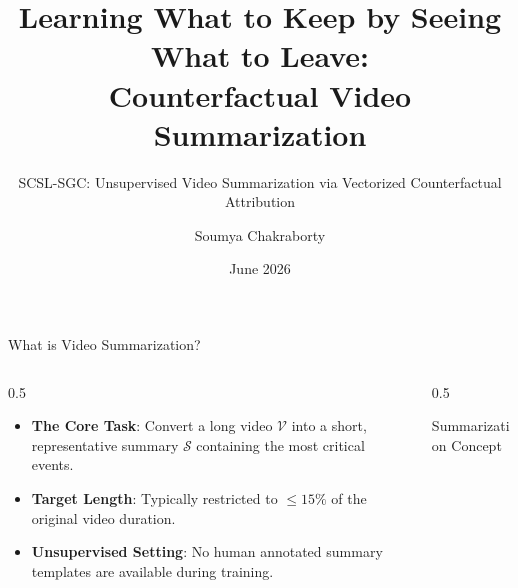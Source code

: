 \documentclass[aspectratio=169]{beamer}
\title[Learning What to Keep by Seeing What to Leave]{Learning What to Keep by Seeing What to Leave:\\Counterfactual Video Summarization}
\subtitle{SCSL-SGC: Unsupervised Video Summarization via Vectorized Counterfactual Attribution}
\author[Soumya Chakraborty]{Soumya Chakraborty}
\institute[AAAI '26]{AAAI Conference on Artificial Intelligence}
\date{June 2026}
\begin{document}
\begin{frame}
    \titlepage
\end{frame}

\begin{frame}{What is Video Summarization?}
    \begin{columns}
        \begin{column}{0.5\textwidth}
            \begin{itemize}
                \item \textbf{The Core Task}: Convert a long video $\mathcal{V}$ into a short, representative summary $\mathcal{S}$ containing the most critical events.
                \item \textbf{Target Length}: Typically restricted to $\le 15\%$ of the original video duration.
                \item \textbf{Unsupervised Setting}: No human annotated summary templates are available during training.
            \end{itemize}
        \end{column}
        \begin{column}{0.5\textwidth}
            \begin{block}{Summarization Concept}
                \centering
            \end{block}
        \end{column}
    \end{columns}
\end{frame}
\end{document}
